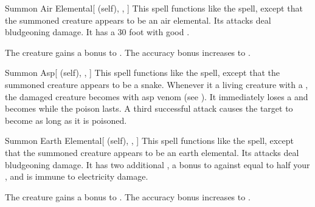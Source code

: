 \lowercase{\hypertarget{spell:Summon Air Elemental}{}}\label{spell:Summon Air Elemental}
\begin{attuneability}[Rank 4]{\hypertarget{spell:Summon Air Elemental}{Summon Air Elemental}}[ (self), , ]
This spell functions like the  spell, except that the summoned creature appears to be an air elemental.
Its attacks deal bludgeoning damage.
It has a 30 foot  with good .

\rankline
{} The creature gains a  bonus to .
 The accuracy bonus increases to .
\end{attuneability}
\vspace{0.25em}



\lowercase{\hypertarget{spell:Summon Asp}{}}\label{spell:Summon Asp}
\begin{attuneability}[Rank 4]{\hypertarget{spell:Summon Asp}{Summon Asp}}[ (self), , ]
This spell functions like the  spell, except that the summoned creature appears to be a snake.
Whenever it  a living creature with a , the damaged creature becomes  with asp venom (see ).
It immediately loses a  and becomes  while the poison lasts.
A third successful attack causes the target to become  as long as it is poisoned.
\end{attuneability}
\vspace{0.25em}



\lowercase{\hypertarget{spell:Summon Earth Elemental}{}}\label{spell:Summon Earth Elemental}
\begin{attuneability}[Rank 4]{\hypertarget{spell:Summon Earth Elemental}{Summon Earth Elemental}}[ (self), , ]
This spell functions like the  spell, except that the summoned creature appears to be an earth elemental.
Its attacks deal bludgeoning damage.
It has two additional , a bonus to  against  equal to half your , and is immune to electricity damage.

\rankline
{} The creature gains a  bonus to .
 The accuracy bonus increases to .
\end{attuneability}
\vspace{0.25em}



